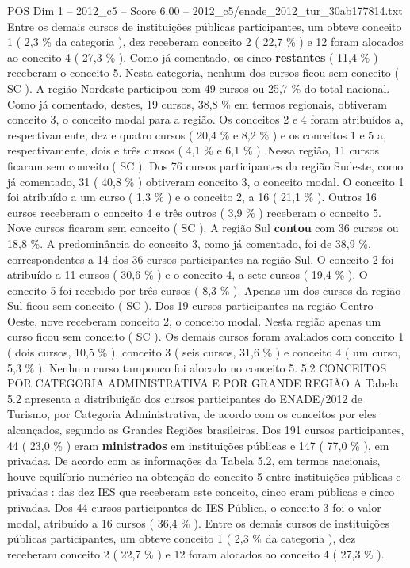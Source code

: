 \begin{textsample}{POS Dim 1 – 2012\_c5 – Score 6.00 – 2012\_c5/enade\_2012\_tur\_30ab177814.txt}
Entre os demais cursos de instituições públicas participantes, um obteve conceito 1 ( 2,3 \% da categoria ), dez receberam conceito 2 ( 22,7 \% ) e 12 foram alocados ao conceito 4 ( 27,3 \% ).
Como já comentado, os cinco \textbf{restantes} ( 11,4 \% ) receberam o conceito 5.
Nesta categoria, nenhum dos cursos ficou sem conceito ( SC ).
A região Nordeste participou com 49 cursos ou 25,7 \% do total nacional.
Como já comentado, destes, 19 cursos, 38,8 \% em termos regionais, obtiveram conceito 3, o conceito modal para a região.
Os conceitos 2 e 4 foram atribuídos a, respectivamente, dez e quatro cursos ( 20,4 \% e 8,2 \% ) e os conceitos 1 e 5 a, respectivamente, dois e três cursos ( 4,1 \% e 6,1 \% ).
Nessa região, 11 cursos ficaram sem conceito ( SC ).
Dos 76 cursos participantes da região Sudeste, como já comentado, 31 ( 40,8 \% ) obtiveram conceito 3, o conceito modal.
O conceito 1 foi atribuído a um curso ( 1,3 \% ) e o conceito 2, a 16 ( 21,1 \% ).
Outros 16 cursos receberam o conceito 4 e três outros ( 3,9 \% ) receberam o conceito 5.
Nove cursos ficaram sem conceito ( SC ).
A região Sul \textbf{contou} com 36 cursos ou 18,8 \%.
A predominância do conceito 3, como já comentado, foi de 38,9 \%, correspondentes a 14 dos 36 cursos participantes na região Sul.
O conceito 2 foi atribuído a 11 cursos ( 30,6 \% ) e o conceito 4, a sete cursos ( 19,4 \% ).
O conceito 5 foi recebido por três cursos ( 8,3 \% ).
Apenas um dos cursos da região Sul ficou sem conceito ( SC ).
Dos 19 cursos participantes na região Centro-Oeste, nove receberam conceito 2, o conceito modal.
Nesta região apenas um curso ficou sem conceito ( SC ).
Os demais cursos foram avaliados com conceito 1 ( dois cursos, 10,5 \% ), conceito 3 ( seis cursos, 31,6 \% ) e conceito 4 ( um curso, 5,3 \% ).
Nenhum curso tampouco foi alocado no conceito 5. 5.2 CONCEITOS POR CATEGORIA ADMINISTRATIVA E POR GRANDE REGIÃO A Tabela 5.2 apresenta a distribuição dos cursos participantes do ENADE/2012 de Turismo, por Categoria Administrativa, de acordo com os conceitos por eles alcançados, segundo as Grandes Regiões brasileiras.
Dos 191 cursos participantes, 44 ( 23,0 \% ) eram \textbf{ministrados} em instituições públicas e 147 ( 77,0 \% ), em privadas.
De acordo com as informações da Tabela 5.2, em termos nacionais, houve equilíbrio numérico na obtenção do conceito 5 entre instituições públicas e privadas : das dez IES que receberam este conceito, cinco eram públicas e cinco privadas.
Dos 44 cursos participantes de IES Pública, o conceito 3 foi o valor modal, atribuído a 16 cursos ( 36,4 \% ).
Entre os demais cursos de instituições públicas participantes, um obteve conceito 1 ( 2,3 \% da categoria ), dez receberam conceito 2 ( 22,7 \% ) e 12 foram alocados ao conceito 4 ( 27,3 \% ).

\end{textsample}
